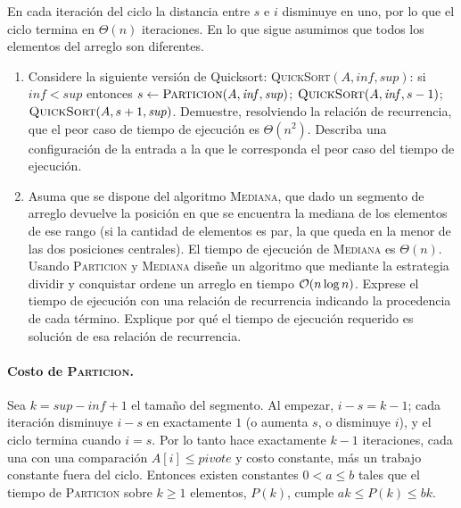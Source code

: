 \begin{enunciado}
En cada iteración del ciclo la distancia entre $s$ e $i$ disminuye en uno, por lo que el
ciclo termina en $\Theta(n)$ iteraciones. En lo que sigue asumimos que todos los
elementos del arreglo son diferentes.
\begin{enumerate}[label=(\alph*)]
\item Considere la siguiente versión de Quicksort:
\textsc{QuickSort}$(A,\mathit{inf},\mathit{sup})$: si $\mathit{inf}<\mathit{sup}$ entonces
$s\gets\textsc{Particion}(A,\mathit{inf},\mathit{sup})$;
$\textsc{QuickSort}(A,\mathit{inf},s-1)$; $\textsc{QuickSort}(A,s+1,\mathit{sup})$.
Demuestre, resolviendo la relación de recurrencia, que el peor caso de tiempo de
ejecución es $\Theta(n^2)$. Describa una configuración de la entrada a la que le
corresponda el peor caso del tiempo de ejecución.
\item Asuma que se dispone del algoritmo \textsc{Mediana}, que dado un segmento de arreglo
devuelve la posición en que se encuentra la mediana de los elementos de ese rango (si la
cantidad de elementos es par, la que queda en la menor de las dos posiciones centrales). El
tiempo de ejecución de \textsc{Mediana} es $\Theta(n)$.
Usando \textsc{Particion} y \textsc{Mediana} diseñe un algoritmo que mediante la
estrategia dividir y conquistar ordene un arreglo en tiempo $\mathcal{O}(n\log n)$. Exprese el
tiempo de ejecución con una relación de recurrencia indicando la procedencia de cada
término. Explique por qué el tiempo de ejecución requerido es solución de esa relación de
recurrencia.
\end{enumerate}
\end{enunciado}


\paragraph{Costo de \textsc{Particion}.} Sea $k=\mathit{sup}-\mathit{inf}+1$ el tamaño
del segmento. Al empezar, $i-s=k-1$; cada iteración disminuye $i-s$ en exactamente $1$
(o aumenta $s$, o disminuye $i$), y el ciclo termina cuando $i=s$. Por lo tanto hace
exactamente $k-1$ iteraciones, cada una con una comparación $A[i]\le pivote$ y costo
constante, más un trabajo constante fuera del ciclo. Entonces existen constantes
$0<a\le b$ tales que el tiempo de \textsc{Particion} sobre $k\ge1$ elementos, $P(k)$,
cumple $ak\le P(k)\le bk$.

